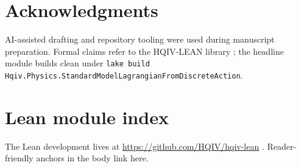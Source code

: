 \documentclass[11pt]{amsart}
\begin{document}
\section*{Acknowledgments}
AI-assisted drafting and repository tooling were used during manuscript
preparation. Formal claims refer to the HQIV-LEAN library \cite{hqiv-lean};
the headline module builds clean under \texttt{lake build}
\texttt{Hqiv.Physics.StandardModelLagrangianFromDiscreteAction}.

\appendix
\section{Lean module index}
\label{app:lean-index}

The Lean development lives at \url{https://github.com/HQIV/hqiv-lean}
\cite{hqiv-lean}. Reader-friendly anchors in the body link here.
\end{document}
